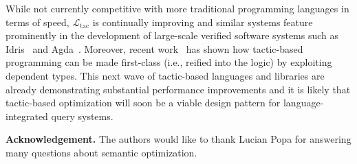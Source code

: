\documentclass[preprint]{sigplanconf}
\newcommand{\ltac}[0]{\ensuremath{\mathcal{L}_{\mathrm{tac}}}}
\begin{document}
While not currently competitive with more traditional programming languages in terms of speed, \ltac{} is continually improving and similar systems feature prominently in the development of large-scale verified software systems such as Idris~\cite{brady2013idris} and Agda~\cite{agda}.  Moreover, recent work~\cite{malecha2015thesis,devriese2013tsmp,vanderwalt2013engineering-reflection-agda} has shown how tactic-based programming can be made first-class (i.e., reified into the logic) by exploiting dependent types.
This next wave of tactic-based languages and libraries are already demonstrating substantial performance improvements and it is likely that tactic-based optimization will soon be a viable design pattern for language-integrated query systems.






{\bf Acknowledgement.}  The authors would like to thank Lucian Popa for answering many questions about semantic optimization.



\end{document}
